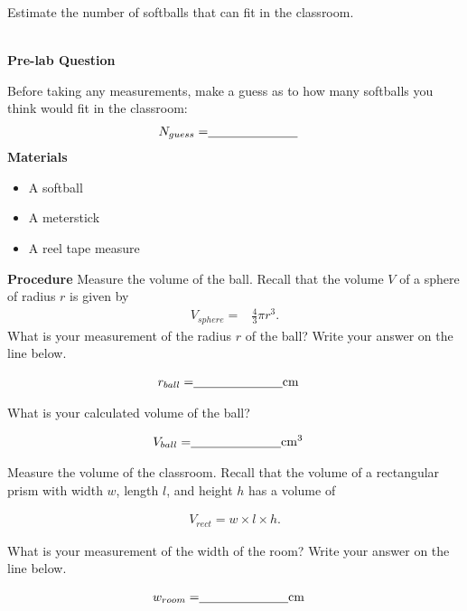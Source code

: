 \qsp
Estimate the number of softballs that can fit in the classroom.
\qsp

\textbf{\\\Large Pre-lab Question\\}
\qsp
\begin{questions}

\question[1] Before taking any measurements, make a guess as to how many softballs you think would fit in the classroom:
\qsp
\begin{align*}
N_{guess} =& \underline{\hspace{2.5cm}}
\end{align*}
\newpage
\textbf{\Large Materials}
\qsp
\begin{itemize}
\item A softball
\item A meterstick
\item A reel tape measure
\end{itemize}
\qsp
\textbf{\Large Procedure}
\qsp
\question[2] Measure the volume of the ball. Recall that the volume $V$ of a sphere of radius $r$ is given by 
\begin{align*}
V_{sphere} =& \frac{4}{3}\pi r^3.
\end{align*}
 What is your measurement of the radius $r$ of the ball? Write your answer on the line below.
\qsp

\begin{align*}
r_{ball} =& \underline{\hspace{2.5cm}}\SI{}{cm}
\end{align*} 

What is your calculated volume of the ball? 
\qsp 

\begin{align*}
V_{ball} =& \underline{\hspace{2.5cm}}\SI{}{cm^3}
\end{align*} 

\question[2] Measure the volume of the classroom. Recall that the volume of a rectangular prism with width $w$, length $l$, and height $h$ has a volume of

\begin{align*}
V_{rect} = w\times l\times h.
\end{align*}

What is your measurement of the width of the room? Write your answer on the line below.
\qsp

\begin{align*}
w_{room} =& \underline{\hspace{2.5cm}}\SI{}{cm}
\end{align*} 


\end{questions}

